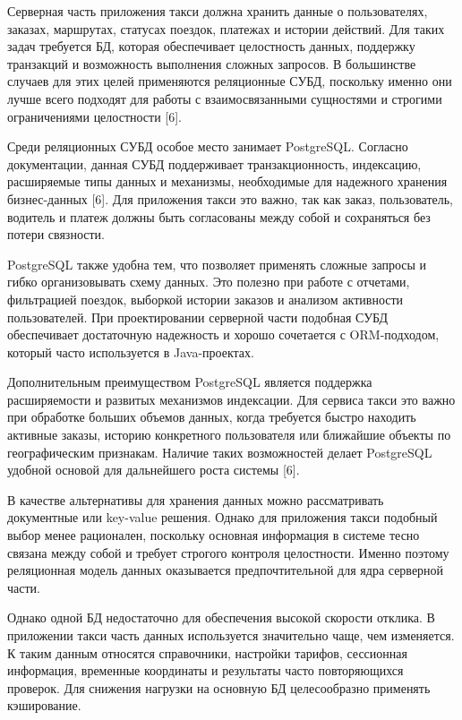 {\gostFont

  \par \redline Серверная часть приложения такси должна хранить данные о пользователях, заказах, маршрутах, статусах поездок, платежах и истории действий. Для таких задач требуется БД, которая обеспечивает целостность данных, поддержку транзакций и возможность выполнения сложных запросов. В большинстве случаев для этих целей применяются реляционные СУБД, поскольку именно они лучше всего подходят для работы с взаимосвязанными сущностями и строгими ограничениями целостности [6].

  \par \redline Среди реляционных СУБД особое место занимает PostgreSQL. Согласно документации, данная СУБД поддерживает транзакционность, индексацию, расширяемые типы данных и механизмы, необходимые для надежного хранения бизнес-данных [6]. Для приложения такси это важно, так как заказ, пользователь, водитель и платеж должны быть согласованы между собой и сохраняться без потери связности.

  \par \redline PostgreSQL также удобна тем, что позволяет применять сложные запросы и гибко организовывать схему данных. Это полезно при работе с отчетами, фильтрацией поездок, выборкой истории заказов и анализом активности пользователей. При проектировании серверной части подобная СУБД обеспечивает достаточную надежность и хорошо сочетается с ORM-подходом, который часто используется в Java-проектах.

  \par \redline Дополнительным преимуществом PostgreSQL является поддержка расширяемости и развитых механизмов индексации. Для сервиса такси это важно при обработке больших объемов данных, когда требуется быстро находить активные заказы, историю конкретного пользователя или ближайшие объекты по географическим признакам. Наличие таких возможностей делает PostgreSQL удобной основой для дальнейшего роста системы [6].

  \par \redline В качестве альтернативы для хранения данных можно рассматривать документные или key-value решения. Однако для приложения такси подобный выбор менее рационален, поскольку основная информация в системе тесно связана между собой и требует строгого контроля целостности. Именно поэтому реляционная модель данных оказывается предпочтительной для ядра серверной части.

  \par \redline Однако одной БД недостаточно для обеспечения высокой скорости отклика. В приложении такси часть данных используется значительно чаще, чем изменяется. К таким данным относятся справочники, настройки тарифов, сессионная информация, временные координаты и результаты часто повторяющихся проверок. Для снижения нагрузки на основную БД целесообразно применять кэширование.

}
